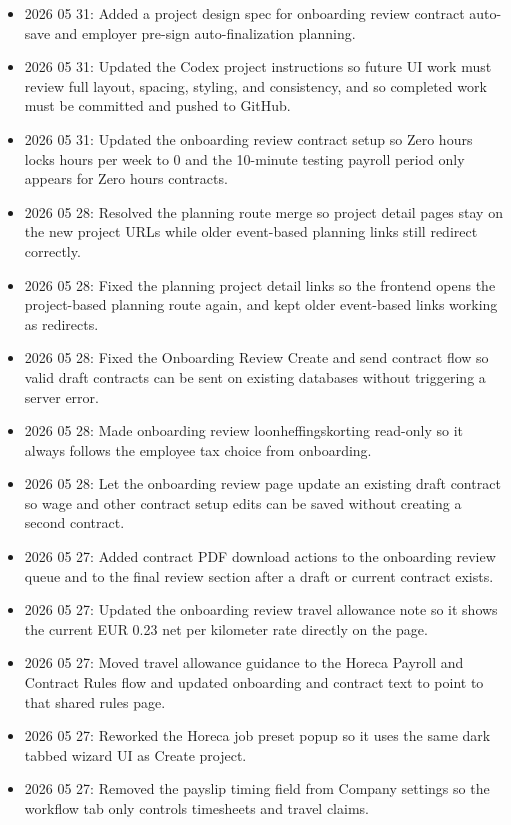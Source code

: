 \documentclass[11pt]{article}
\begin{document}
\begin{itemize}
    \item 2026 05 31: Added a project design spec for onboarding review contract auto-save and employer pre-sign auto-finalization planning.
    \item 2026 05 31: Updated the Codex project instructions so future UI work must review full layout, spacing, styling, and consistency, and so completed work must be committed and pushed to GitHub.
    \item 2026 05 31: Updated the onboarding review contract setup so Zero hours locks hours per week to 0 and the 10-minute testing payroll period only appears for Zero hours contracts.
    \item 2026 05 28: Resolved the planning route merge so project detail pages stay on the new project URLs while older event-based planning links still redirect correctly.
    \item 2026 05 28: Fixed the planning project detail links so the frontend opens the project-based planning route again, and kept older event-based links working as redirects.
    \item 2026 05 28: Fixed the Onboarding Review Create and send contract flow so valid draft contracts can be sent on existing databases without triggering a server error.
    \item 2026 05 28: Made onboarding review loonheffingskorting read-only so it always follows the employee tax choice from onboarding.
    \item 2026 05 28: Let the onboarding review page update an existing draft contract so wage and other contract setup edits can be saved without creating a second contract.
    \item 2026 05 27: Added contract PDF download actions to the onboarding review queue and to the final review section after a draft or current contract exists.
    \item 2026 05 27: Updated the onboarding review travel allowance note so it shows the current EUR 0.23 net per kilometer rate directly on the page.
    \item 2026 05 27: Moved travel allowance guidance to the Horeca Payroll and Contract Rules flow and updated onboarding and contract text to point to that shared rules page.
    \item 2026 05 27: Reworked the Horeca job preset popup so it uses the same dark tabbed wizard UI as Create project.
    \item 2026 05 27: Removed the payslip timing field from Company settings so the workflow tab only controls timesheets and travel claims.

\end{itemize}
\end{document}
